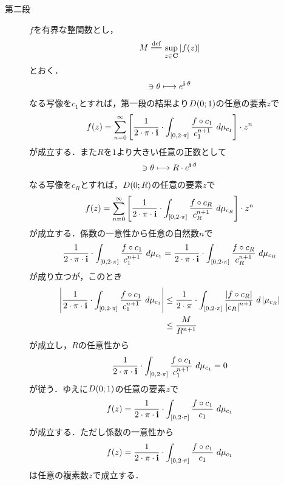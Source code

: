 \begin{sketch}
\begin{description}
			\item[第二段]
				$f$を有界な整関数とし，
				\begin{align}
					M \defeq \sup{z \in \C}{|f(z)|}
				\end{align}
				とおく．
				\begin{align}
					[0,2\cdot\pi] \ni \theta \longmapsto e^{\isym \cdot \theta}
				\end{align}
				なる写像を$c_{1}$とすれば，第一段の結果より$D(0;1)$の任意の要素$z$で
				\begin{align}
					f(z) = \sum_{n=0}^{\infty} \left[ \frac{1}{2\cdot\pi\cdot\mathbf{i}} \cdot \int_{[0,2\cdot\pi]} \frac{f \circ c_{1}}{c_{1}^{n+1}}\ d\mu_{c_{1}} \right] \cdot z^{n}
				\end{align}
				が成立する．また$R$を$1$より大きい任意の正数として
				\begin{align}
					[0,2\cdot\pi] \ni \theta \longmapsto R \cdot e^{\isym \cdot \theta}
				\end{align}
				なる写像を$c_{R}$とすれば，$D(0;R)$の任意の要素$z$で
				\begin{align}
					f(z) = \sum_{n=0}^{\infty} \left[ \frac{1}{2\cdot\pi\cdot\mathbf{i}} \cdot \int_{[0,2\cdot\pi]} \frac{f \circ c_{R}}{c_{R}^{n+1}}\ d\mu_{c_{R}} \right] \cdot z^{n}
				\end{align}
				が成立する．係数の一意性から任意の自然数$n$で
				\begin{align}
					\frac{1}{2\cdot\pi\cdot\mathbf{i}} \cdot \int_{[0,2\cdot\pi]} \frac{f \circ c_{1}}{c_{1}^{n+1}}\ d\mu_{c_{1}}
					= \frac{1}{2\cdot\pi\cdot\mathbf{i}} \cdot \int_{[0,2\cdot\pi]} \frac{f \circ c_{R}}{c_{R}^{n+1}}\ d\mu_{c_{R}}
				\end{align}
				が成り立つが，このとき
				\begin{align}
					\left|\frac{1}{2\cdot\pi\cdot\isym} \cdot \int_{[0,2\cdot\pi]} \frac{f \circ c_{1}}{c_{1}^{n+1}}\ d\mu_{c_{1}}\right|
					&\leq \frac{1}{2\cdot\pi} \cdot \int_{[0,2\cdot\pi]} \frac{\left|f \circ c_{R}\right|}{\left|c_{R}\right|^{n+1}}\ d\left|\mu_{c_{R}}\right| \\
					&\leq \frac{M}{R^{n+1}} 
				\end{align}
				が成立し，$R$の任意性から
				\begin{align}
					\frac{1}{2\cdot\pi\cdot\mathbf{i}} \cdot \int_{[0,2\cdot\pi]} \frac{f \circ c_{1}}{c_{1}^{n+1}}\ d\mu_{c_{1}}
					= 0
				\end{align}
				が従う．ゆえに$D(0;1)$の任意の要素$z$で
				\begin{align}
					f(z) = \frac{1}{2\cdot\pi\cdot\mathbf{i}} \cdot \int_{[0,2\cdot\pi]} \frac{f \circ c_{1}}{c_{1}}\ d\mu_{c_{1}}
				\end{align}
				が成立する．ただし係数の一意性から
				\begin{align}
					f(z) = \frac{1}{2\cdot\pi\cdot\mathbf{i}} \cdot \int_{[0,2\cdot\pi]} \frac{f \circ c_{1}}{c_{1}}\ d\mu_{c_{1}}
				\end{align}
				は任意の複素数$z$で成立する．
				\QED
		\end{description}
	\end{sketch}
	
